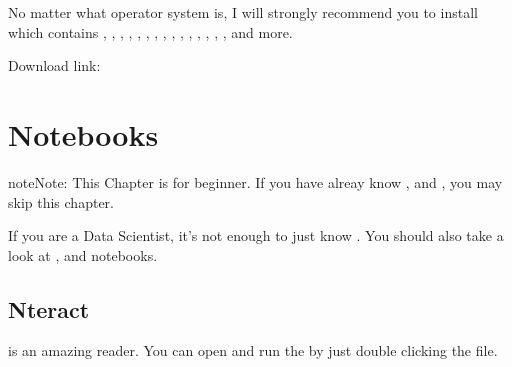 \documentclass[letterpaper,12pt,english]{sphinxmanual}
\begin{document}
No matter what operator system is, I will strongly recommend you to install  which contains , , , , , , , ,
, , , , , , ,  and more.

Download link: 

\begin{figure}[htbp]
\centering

\noindent{}
\end{figure}


\chapter{Notebooks}
\label{\detokenize{nb:notebooks}}\label{\detokenize{nb:nb}}\label{\detokenize{nb::doc}}
\begin{sphinxadmonition}{note}{Note:}
This Chapter {\hyperref[\detokenize{nb:nb}]{}} is for beginner.  If you have alreay know  ,  and , you may skip this chapter.
\end{sphinxadmonition}

If you are a Data Scientist, it’s not enough to just know . You should also take a look at ,  and  notebooks.


\section{Nteract}
\label{\detokenize{nb:nteract}}
 is an amazing  reader. You can open and run the  by just double clicking the  file.
\end{document}
